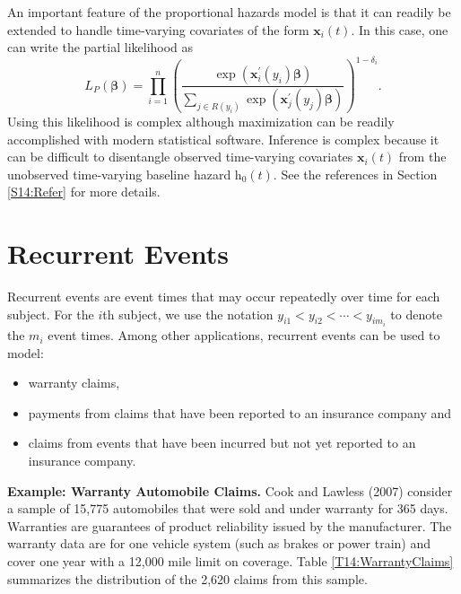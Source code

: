 An important feature of the proportional hazards model is that it
can readily be extended to handle time-varying covariates of the
form $\mathbf{x}_i(t)$. In this case, one can write the partial
likelihood as
\begin{equation*}
L_P(\boldsymbol \beta)
 = \prod_{i=1}^n
\left( \frac{\exp( \mathbf{x}_i^{\prime}(y_i) \boldsymbol \beta )}
{\sum_{j \in R(y_i)} \exp( \mathbf{x}_j^{\prime}(y_j) \boldsymbol
\beta ) }\right)^{1-\delta_i} .
\end{equation*}
Using this likelihood is complex although maximization can be
readily accomplished with modern statistical software. Inference is
complex because it can be difficult to disentangle observed
time-varying covariates $\mathbf{x}_i(t)$ from the unobserved
time-varying baseline hazard $\mathrm{h}_0(t)$. See the references
in Section \ref{S14:Refer} for more details.


\section{Recurrent
Events}\label{S14:RecurrentEvents}

Recurrent events are event times that may occur repeatedly over time
for each subject. For the $i$th subject, we use the notation $y_{i1}
< y_{i2} < \cdots < y_{im_i}$ to denote the $m_i$ event times. Among
other applications, recurrent events can be used to model:
\begin{itemize}
\item warranty claims, \item payments from claims that have been reported to
an insurance company and \item claims from events that have been
incurred but not yet reported to an insurance company.
\end{itemize}



\linejed{}

\textbf{ Example: Warranty Automobile Claims.} Cook and Lawless (2007) consider a sample of
15,775 automobiles that were sold and under warranty for 365 days.
Warranties are guarantees of product reliability issued by the
manufacturer. The warranty data are for one vehicle system (such as
brakes or power train) and cover one year with a 12,000 mile limit
on coverage. Table \ref{T14:WarrantyClaims} summarizes the
distribution of the 2,620 claims from this sample.


